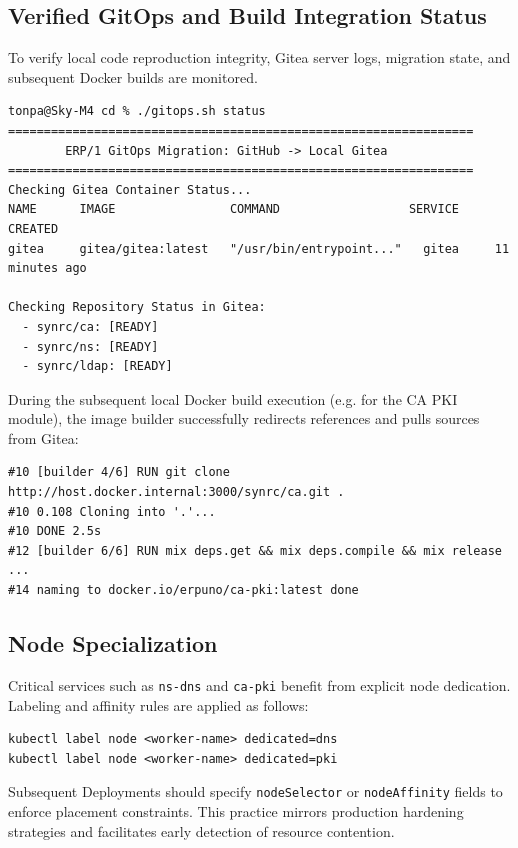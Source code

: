 \documentclass{article}
\begin{document}
\subsection{Verified GitOps and Build Integration Status}

To verify local code reproduction integrity, Gitea server logs, migration state,
and subsequent Docker builds are monitored.

\begin{verbatim}
tonpa@Sky-M4 cd % ./gitops.sh status
=================================================================
        ERP/1 GitOps Migration: GitHub -> Local Gitea
=================================================================
Checking Gitea Container Status...
NAME      IMAGE                COMMAND                  SERVICE   CREATED
gitea     gitea/gitea:latest   "/usr/bin/entrypoint..."   gitea     11 minutes ago

Checking Repository Status in Gitea:
  - synrc/ca: [READY]
  - synrc/ns: [READY]
  - synrc/ldap: [READY]
\end{verbatim}

During the subsequent local Docker build execution (e.g. for the CA PKI module),
the image builder successfully redirects references and pulls sources from Gitea:
\begin{verbatim}
#10 [builder 4/6] RUN git clone http://host.docker.internal:3000/synrc/ca.git .
#10 0.108 Cloning into '.'...
#10 DONE 2.5s
#12 [builder 6/6] RUN mix deps.get && mix deps.compile && mix release
...
#14 naming to docker.io/erpuno/ca-pki:latest done
\end{verbatim}

\subsection{Node Specialization}

Critical services such as \texttt{ns-dns} and \texttt{ca-pki} benefit from explicit
node dedication. Labeling and affinity rules are applied as follows:

\begin{verbatim}
kubectl label node <worker-name> dedicated=dns
kubectl label node <worker-name> dedicated=pki
\end{verbatim}

Subsequent Deployments should specify \texttt{nodeSelector} or \texttt{nodeAffinity} fields to enforce placement constraints.
This practice mirrors production hardening strategies and facilitates early detection of resource contention.
\end{document}
